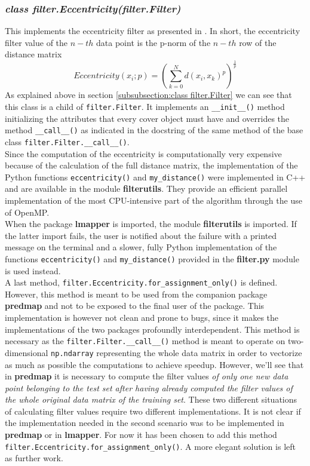 \subsubsection{\textit{class filter.Eccentricity(filter.Filter)}}
This implements the eccentricity filter as presented in \cite{pythonmapper}. In short, the eccentricity filter value of the $n-th$ data point is the p-norm of the $n-th$ row of the distance matrix
$$Eccentricity(x_i; p) = \left(\sum_{k=0}^{N} d(x_i, x_k)^p\right)^\frac{1}{p}$$
As explained above in section \ref{subsubsection:class filter.Filter} we can see that this class is a child of \lstinline|filter.Filter|. It implements an \lstinline|__init__()| method initializing the attributes that every cover object must have and overrides the method \lstinline|__call__()| as indicated in the docstring of the same method of the base class \lstinline|filter.Filter.__call__()|.\\
Since the computation of the eccentricity is computationally very expensive because of the calculation of the full distance matrix, the implementation of the Python functions \lstinline{eccentricity()} and \lstinline{my_distance()} were implemented in C++ and are available in the module \textbf{filterutils}. They provide an efficient parallel implementation of the most CPU-intensive part of the algorithm through the use of OpenMP.\\
When the package \textbf{lmapper} is imported, the module \textbf{filterutils} is imported. If the latter import fails, the user is notified about the failure with a printed message on the terminal and a slower, fully Python implementation of the functions \lstinline{eccentricity()} and \lstinline{my_distance()} provided in the \textbf{filter.py} module is used instead.\\
A last method, \lstinline|filter.Eccentricity.for_assignment_only()| is defined. However, this method is meant to be used from the companion package \textbf{predmap} and not to be exposed to the final user of the package. This implementation is however not clean and prone to bugs, since it makes the implementations of the two packages profoundly interdependent. This method is necessary as the \lstinline|filter.Filter.__call__()| method is meant to operate on two-dimensional \lstinline|np.ndarray| representing the whole data matrix in order to vectorize as much as possible the computations to achieve speedup. However, we'll see that in \textbf{predmap} it is necessary to compute the filter values \textit{of only one new data point belonging to the test set after having already computed the filter values of the whole original data matrix of the training set}. These two different situations of calculating filter values require two different implementations. It is not clear if the implementation needed in the second scenario was to be implemented in \textbf{predmap} or in \textbf{lmapper}. For now it has been chosen to add this method \lstinline|filter.Eccentricity.for_assignment_only()|. A more elegant solution is left as further work.

